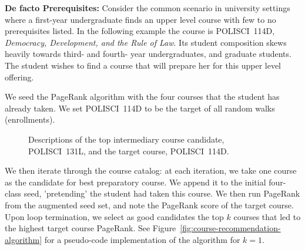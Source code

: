 {\bf De facto Prerequisites:} Consider the common scenario in
university settings where a first-year undergraduate finds an upper
level course with few to no prerequisites listed. In the following
example the course is POLISCI~114D, {\em Democracy, Development, and
  the Rule of Law}. Its student composition skews heavily towards
third- and fourth- year undergraduates, and graduate students. The
student wishes to find a course that will prepare her for this upper
level offering.

We seed the PageRank algorithm with the four courses that the student
has already taken. We set POLISCI~114D to be the target of all random
walks (enrollments).

\begin{figure}
    \centering
    \noindent{}
    \noindent{}
    \caption{Descriptions of the top intermediary course candidate,
      POLISCI~131L, and the target course, POLISCI~114D.}
    \label{fig:pr-course-descriptions}
\end{figure}

We then iterate through the course catalog: at each iteration, we take
one course as the candidate for best preparatory course. We append it
to the initial four-class seed, 'pretending' the student had taken
this course. We then run PageRank from the augmented seed set, and
note the PageRank score of the target course. Upon loop termination,
we select as good candidates the top $k$ courses that led to the
highest target course PageRank.  See
Figure~\ref{fig:course-recommendation-algorithm} for a pseudo-code
implementation of the algorithm for $k=1$.

